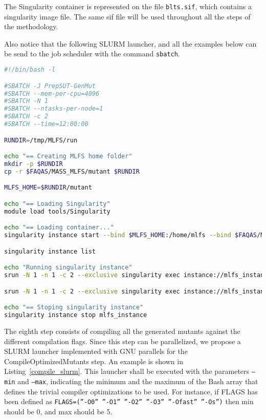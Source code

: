 The Singularity container is represented on the file \texttt{blts.sif}, which contains a singularity image file. The same sif file will be used throughout all the steps of the methodology.

Also notice that the following SLURM launcher, and all the examples below can be send to the job scheduler with the command \texttt{sbatch}.

\begin{lstlisting}[language=bash, label=prepare_slurm ,caption=Example of the SLURM launcher for PrepareSUT and GenerateMutants steps.]
#!/bin/bash -l

#SBATCH -J PrepSUT-GenMut
#SBATCH --mem-per-cpu=4096
#SBATCH -N 1
#SBATCH --ntasks-per-node=1
#SBATCH -c 2
#SBATCH --time=12:00:00

RUNDIR=/tmp/MLFS/run

echo "== Creating MLFS home folder"
mkdir -p $RUNDIR
cp -r $FAQAS/MASS_MLFS/mutant $RUNDIR

MLFS_HOME=$RUNDIR/mutant

echo "== Loading Singularity"
module load tools/Singularity

echo "== Loading container..."
singularity instance start --bind $MLFS_HOME:/home/mlfs --bind $FAQAS/MASS_MLFS/unit-test-suite:/home/mlfs/unit-test-suite --bind $FAQAS/MASS_MLFS/unit-reports:/home/mlfs/unit-reports --bind $FAQAS/MASS_MLFS/MASS_WORKSPACE:/opt/MLFS --bind $FAQAS/srcirorfaqas:/opt/srcirorfaqas $FAQAS/MASS_MLFS/blts.sif mlfs_instance

singularity instance list

echo "Running singularity instance"
srun -N 1 -n 1 -c 2 --exclusive singularity exec instance://mlfs_instance /bin/bash /opt/MLFS/PrepareSUT.sh

srun -N 1 -n 1 -c 2 --exclusive singularity exec instance://mlfs_instance /bin/bash /opt/MLFS/GenerateMutants.sh

echo "== Stoping singularity instance"
singularity instance stop mlfs_instance
\end{lstlisting}

The eighth step consists of compiling all the generated mutants against the different compilation flags. Since this step can be parallelized, we propose a SLURM launcher implemented with GNU parallels for the CompileOptimizedMutants step. An example is shown in Listing~\ref{compile_slurm}. This launcher shall be executed with the parameters \texttt{--min} and \texttt{--max}, indicating the minimum and the maximum of the Bash array that defines the trivial compiler optimizations to be used. For instance, if FLAGS has been defined as \texttt{FLAGS=(”-O0” ”-O1” ”-O2” ”-O3” ”-Ofast” ”-Os”)} then min should be 0, and max should be 5.

